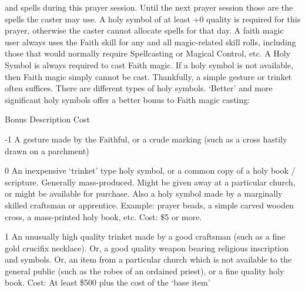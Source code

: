 \documentclass[twoside]{book}
\begin{document}
               and spells during this prayer session. Until the next
               prayer session those are the spells the caster may use. A
               holy symbol of at least +0 quality is required for this
               prayer, otherwise the caster cannot allocate spells for
               that day.   A faith magic user always uses the Faith skill for
               any and all magic-related skill rolls, including those
               that would normally require Spellcasting or Magical
               Control, etc.   A Holy Symbol is always required to cast Faith
               magic. If a holy symbol is not available, then Faith magic
               simply cannot be cast. Thankfully, a simple gesture or
               trinket often suffices. There are different types of holy
               symbols. `Better' and more significant holy
               symbols offer a better bonus to Faith magic casting:
                 
                
                  
                   Bonus   
                   Description   
                   Cost   
                  
                  
                   -1   
                     A gesture made by the Faithful, or a crude
                     marking (such as a cross hastily drawn on a
                     parchment) 
                  
                  
                   0   
                     An inexpensive `trinket' type holy
                     symbol, or a common copy of a holy book / scripture.
                     Generally mass-produced. Might be given away at a
                     particular church, or might be available for
                     purchase. Also a holy symbol made by a marginally
                     skilled craftsman or apprentice. Example: prayer
                     beads, a simple carved wooden cross, a mass-printed
                     holy book, etc. Cost: \$5 or more. 
                  
                  
                   1   
                     An unusually high quality trinket made by a
                     good craftsman (such as a fine gold crucifix
                     necklace). Or, a good quality weapon bearing
                     religious inscription and symbols. Or, an item from
                     a particular church which is not available to the
                     general public (such as the robes of an ordained
                     priest), or a fine quality holy book. 
                     Cost: At least \$500 plus the cost of the
                     `base item' 
                  
\end{document}
